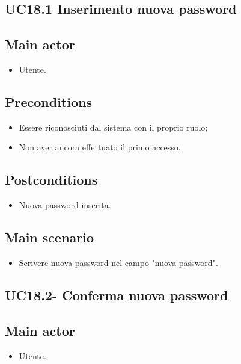 \documentclass{article}
\begin{document}
        \subsection{UC18.1 Inserimento nuova password}
            \subsection*{Main actor}
        \begin{itemize}
            \item Utente.
        \end{itemize}
        
    \subsection*{Preconditions}
        \begin{itemize}
            \item Essere riconosciuti dal sistema con il proprio ruolo;
            \item Non aver ancora effettuato il primo accesso.
        \end{itemize}

    \subsection*{Postconditions}
        \begin{itemize}
            \item Nuova password inserita.
        \end{itemize}

        \subsection*{Main scenario}
        \begin{itemize}
            \item Scrivere nuova password nel campo "nuova password".
        \end{itemize}

    \subsection{UC18.2- Conferma nuova password}
    \subsection*{Main actor}
        \begin{itemize}
            \item Utente.
        \end{itemize}
        
\end{document}
